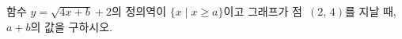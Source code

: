 \hspace*{2mm}\begin{minipage}[t]{\dimexpr\linewidth-2mm\relax}\vspace{0pt}
함수 $y=\sqrt{4x+b}+2$의 정의역이 $\{x \mid x\ge a\}$이고 그래프가 점~$(2,\,4)$를 지날 때, $a+b$의 값을 구하시오. \end{minipage}
